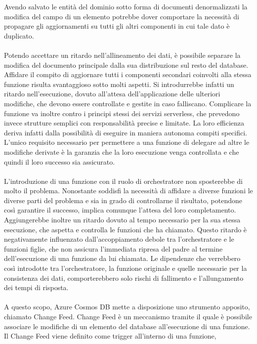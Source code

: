 Avendo salvato le entità del dominio sotto forma di documenti denormalizzati
la modifica del campo di un elemento potrebbe dover comportare la necessità
di propagare gli aggiornamenti su tutti gli altri componenti in cui tale dato è duplicato.\\
\\
Potendo accettare un ritardo nell'allineamento dei dati,
è possibile separare la modifica del documento principale
dalla sua distribuzione sul resto del database.
Affidare il compito di aggiornare tutti i componenti secondari coinvolti
alla stessa funzione risulta svantaggioso sotto molti aspetti.
Si introdurrebbe infatti un ritardo nell'esecuzione,
dovuto all'attesa dell'applicazione delle ulteriori modifiche,
che devono essere controllate e gestite in caso falliscano.
Complicare la funzione va inoltre contro i principi stessi
dei servizi serverless,
che prevedono invece strutture semplici con responsabilità precise e limitate.
La loro efficienza deriva infatti dalla possibilità
di eseguire in maniera autonoma compiti specifici.
L'unico requisito necessario per permettere a una funzione di delegare ad altre le modifiche derivate
è la garanzia che la loro esecuzione venga controllata e che quindi il loro successo sia assicurato.\\
\\
L'introduzione di una funzione con il ruolo di orchestratore
non sposterebbe di molto il problema.
Nonostante soddisfi la necessità di affidare a diverse funzioni
le diverse parti del problema e sia in grado di controllarne il risultato,
potendone così garantire il successo,
implica comunque l'attesa del loro completamento.
Aggiungerebbe inoltre un ritardo dovuto al tempo necessario per la sua stessa esecuzione,
che aspetta e controlla le funzioni che ha chiamato.
Questo ritardo è negativamente influenzato dall'accoppiamento debole
tra l'orchestratore e le funzioni figlie,
che non assicura l'immediata ripresa del padre 
al termine dell'esecuzione di una funzione da lui chiamata.
Le dipendenze che verrebbero così introdotte tra 
l'orchestratore, la funzione originale e quelle necessarie per la consistenza dei dati,
comporterebbero solo rischi di fallimento e l'allungamento dei tempi di risposta.\\
\\
A questo scopo, Azure Cosmos DB mette a disposizione uno strumento apposito, chiamato Change Feed.
Change Feed è un meccanismo tramite il quale è possibile
associare le modifiche di un elemento del database
all'esecuzione di una funzione.
Il Change Feed viene definito come trigger all'interno di una funzione,
